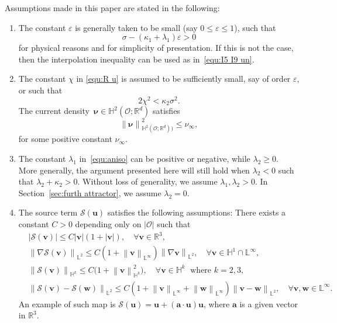 \documentclass[11pt, reqno]{amsart}
\theoremstyle{definition}
\numberwithin{equation}{section}
\newcommand{\bff}{\boldsymbol}
\newcommand{\bb}{\mathbb}
\newcommand{\norm}[2]{\left\|{#1}\right\|_{#2}}
\newcommand{\abs}[1]{\left|{#1}\right|}
\begin{document}
Assumptions made in this paper are stated in the following:
\begin{enumerate}
	\item The constant $\varepsilon$ is generally taken to be small (say $0\leq \varepsilon\leq 1$), such that
	\begin{equation}\label{equ:epsilon sigma kappa}
		\sigma-(\kappa_1+\lambda_1) \varepsilon>0
	\end{equation}
	for physical reasons and for simplicity of presentation. If this is not the case, then the interpolation inequality can be used as in~\eqref{equ:I5 I9 un}.
	\item The constant $\chi$ in \eqref{equ:R u} is assumed to be sufficiently small, say of order $\varepsilon$, or such that
    \begin{equation}\label{equ:chi2}
        2\chi^2 < \kappa_2 \sigma^2.
    \end{equation}
    The current density~$\bff{\nu}\in \bb{H}^2(\mathscr{O};\bb{R}^d)$ satisfies
	\begin{equation}\label{equ:spin bound}
		\norm{\bff{\nu}}{\bb{H}^2(\mathscr{O};\bb{R}^d))}^2 \leq \nu_\infty,
	\end{equation}
	for some positive constant $\nu_\infty$.
	\item The constant $\lambda_1$ in~\eqref{equ:aniso} can be positive or negative, while $\lambda_2\geq 0$. More generally, the argument presented here will still hold when $\lambda_2<0$ such that $\lambda_2+\kappa_2>0$. Without loss of generality, we assume $\lambda_1, \lambda_2>0$. In Section~\ref{sec:furth attractor}, we assume $\lambda_2=0$.
	\item The source term $\mathcal{S}(\bff{u})$ satisfies the following assumptions: There exists a constant $C>0$ depending only on $|\mathscr{O}|$ such that
	\begin{align}
		\label{equ:S u}
		&\abs{\mathcal{S}(\bff{v})} \leq C|\bff{v}| (1+\abs{\bff{v}}), \quad\forall \bff{v}\in \bb{R}^3,
		\\
		\label{equ:S nab u}
		&\norm{\nabla\mathcal{S}(\bff{v})}{\bb{L}^2} \leq C\left(1+\norm{\bff{v}}{\bb{L}^\infty}\right) \norm{\nabla \bff{v}}{\bb{L}^2}, \quad\forall \bff{v}\in \bb{H}^1\cap \bb{L}^\infty,
		\\
		\label{equ:S Delta u}
		&\norm{\mathcal{S}(\bff{v})}{\bb{H}^k} 
		\leq 
		C\big(1+\norm{\bff{v}}{\bb{H}^k}^2\big), \quad\forall \bff{v}\in \bb{H}^k\; \text{ where }k=2,3,
        \\
		\label{equ:S u min v}
		&\norm{\mathcal{S}(\bff{v})-\mathcal{S}(\bff{w})}{\bb{L}^2} 
		\leq
		C\left(1+ \norm{\bff{v}}{\bb{L}^\infty} + \norm{\bff{w}}{\bb{L}^\infty}\right) \norm{\bff{v}-\bff{w}}{\bb{L}^2},
		\quad \forall \bff{v},\bff{w}\in \bb{L}^\infty.
	\end{align}
	An example of such map is $\mathcal{S}(\bff{u})= \bff{u}+ (\bff{a}\cdot \bff{u})\bff{u}$, where $\bff{a}$ is a given vector in $\bb{R}^3$.
\end{enumerate}
\end{document}
